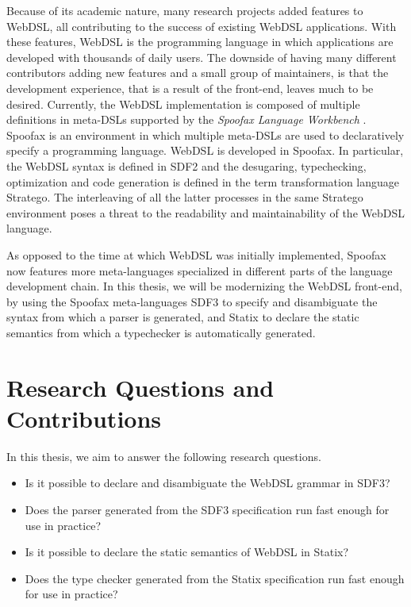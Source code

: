   Because of its academic nature, many research projects added features to WebDSL, all contributing to the success of existing WebDSL applications. With these features, WebDSL is the programming language in which applications are developed with thousands of daily users. The downside of having many different contributors adding new features and a small group of maintainers, is that the development experience, that is a result of the front-end, leaves much to be desired. Currently, the WebDSL implementation is composed of multiple definitions in meta-DSLs supported by the \textit{Spoofax Language Workbench} \autocite{KatsV10}. Spoofax is an environment in which multiple meta-DSLs are used to declaratively specify a programming language. WebDSL is developed in Spoofax. In particular, the WebDSL syntax is defined in SDF2 and the desugaring, typechecking, optimization and code generation is defined in the term transformation language Stratego. The interleaving of all the latter processes in the same Stratego environment poses a threat to the readability and maintainability of the WebDSL language.

  As opposed to the time at which WebDSL was initially implemented, Spoofax now features more meta-languages specialized in different parts of the language development chain. In this thesis, we will be modernizing the WebDSL front-end, by using the Spoofax meta-languages SDF3 to specify and disambiguate the syntax from which a parser is generated, and Statix to declare the static semantics from which a typechecker is automatically generated.

  \section{\label{sec:contributions}Research Questions and Contributions}
    In this thesis, we aim to answer the following research questions.

    \begin{itemize}
      \item Is it possible to declare and disambiguate the WebDSL grammar in SDF3?
      \item Does the parser generated from the SDF3 specification run fast enough for use in practice?
      \item Is it possible to declare the static semantics of WebDSL in Statix?
      \item Does the type checker generated from the Statix specification run fast enough for use in practice?
    \end{itemize}

